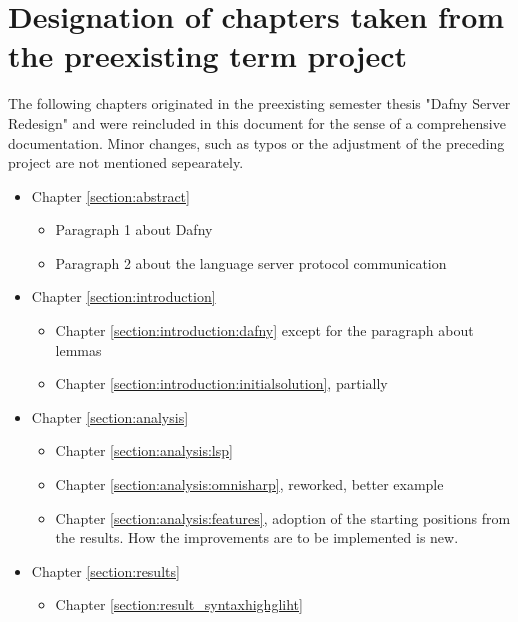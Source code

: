 \section{Designation of chapters taken from the preexisting term project}
The following chapters originated in the preexisting semester thesis "Dafny Server Redesign"\cite{sa} and were reincluded in this document for the sense of a comprehensive documentation. Minor changes, such as typos or the adjustment of the preceding project are not mentioned sepearately.
\begin{itemize}
    \item Chapter \ref{section:abstract} 
        \begin{itemize}
            \item Paragraph 1 about Dafny
            \item Paragraph 2 about the language server protocol communication
        \end{itemize}
    \item Chapter \ref{section:introduction} 
        \begin{itemize}
            \item Chapter \ref{section:introduction:dafny} except for the paragraph about lemmas
            \item Chapter \ref{section:introduction:initialsolution}, partially
        \end{itemize}

    \item Chapter \ref{section:analysis} 
        \begin{itemize}
            \item Chapter \ref{section:analysis:lsp}
            \item Chapter \ref{section:analysis:omnisharp}, reworked, better example
            \item Chapter \ref{section:analysis:features}, adoption of the starting positions from the results. How the improvements are to be implemented is new.
        \end{itemize}

    \item Chapter \ref{section:results} 
        \begin{itemize}
            \item Chapter \ref{section:result_syntaxhighgliht}
        \end{itemize}

\end{itemize}
